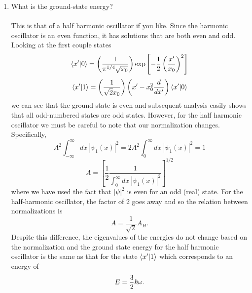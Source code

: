 \documentclass[11pt,letterpaper]{article}
\begin{document}
\begin{enumerate}
\begin{enumerate}
\item What is the ground-state energy?
\\ \\This is that of a half harmonic oscillator if you like. Since the harmonic oscillator is an even function, it has solutions that are both even and odd. Looking at the first couple states
$$\braket{x'|0} = \left(\frac{1}{\pi^{1/4}\sqrt{x_0}}\right)\exp{\left[-\frac{1}{2}\left(\frac{x'}{x_0}\right)^2\right]}$$
$$\braket{x'|1} = \left(\frac{1}{\sqrt 2x_0}\right)\left(x'-x_0^2\frac{d}{dx'}\right)\braket{x'|0}$$
we can see that the ground state is even and subsequent analysis easily shows that all odd-numbered states are odd states. However, for the half harmonic oscillator we must be careful to note that our normalization changes. Specifically,
$$A^2\int_{-\infty}^{\infty}{dx\ |\psi_1(x)|^2} = 2A^2\int_{0}^{\infty}{dx\ |\psi_1(x)|^2}=1$$
$$A = \left[\frac{1}{2}\frac{1}{\int_{0}^{\infty}{dx\ |\psi_1(x)|^2}}\right]^{1/2}$$
where we have used the fact that $|\psi|^2$ is even for an odd (real) state. 
For the half-harmonic oscillator, the factor of $2$ goes away and so the relation between normalizations is
$$A = \frac{1}{\sqrt2}A_H.$$
Despite this difference, the eigenvalues of the energies do not change based on the normalization and  the ground state energy for the half harmonic oscillator is the same as that for the state $\braket{x'|1}$
which corresponds to an energy of 
$$E = \frac{3}{2}\hbar\omega.$$



\end{enumerate}
\end{enumerate}
\end{document}
